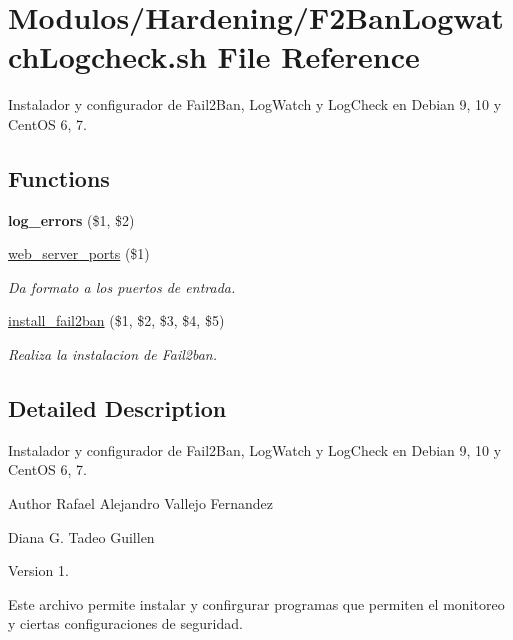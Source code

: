 \hypertarget{F2BanLogwatchLogcheck_8sh}{}\section{Modulos/\+Hardening/\+F2\+Ban\+Logwatch\+Logcheck.sh File Reference}
\label{F2BanLogwatchLogcheck_8sh}


Instalador y configurador de Fail2\+Ban, Log\+Watch y Log\+Check en Debian 9, 10 y Cent\+OS 6, 7.  


\subsection*{Functions}
\begin{DoxyCompactItemize}
\item 
\mbox{\label{F2BanLogwatchLogcheck_8sh_a92067b58a8478c9841b2cd9b75ea3565}} 
{\bfseries log\+\_\+errors} (\$1, \$2)
\item 
\hyperlink{F2BanLogwatchLogcheck_8sh_a5c1106882b059a6588637f440e6b5758}{web\+\_\+server\+\_\+ports} (\$1)
\begin{DoxyCompactList}\small\item\em Da formato a los puertos de entrada. \end{DoxyCompactList}\item 
\hyperlink{F2BanLogwatchLogcheck_8sh_a63476174140e4513bd22005ca9679602}{install\+\_\+fail2ban} (\$1, \$2, \$3, \$4, \$5)
\begin{DoxyCompactList}\small\item\em Realiza la instalacion de Fail2ban. \end{DoxyCompactList}\end{DoxyCompactItemize}


\subsection{Detailed Description}
Instalador y configurador de Fail2\+Ban, Log\+Watch y Log\+Check en Debian 9, 10 y Cent\+OS 6, 7. 

\begin{DoxyAuthor}{Author}
Rafael Alejandro Vallejo Fernandez 

Diana G. Tadeo Guillen 
\end{DoxyAuthor}
\begin{DoxyVersion}{Version}
1.
\end{DoxyVersion}
Este archivo permite instalar y confirgurar programas que permiten el monitoreo y ciertas configuraciones de seguridad. 


